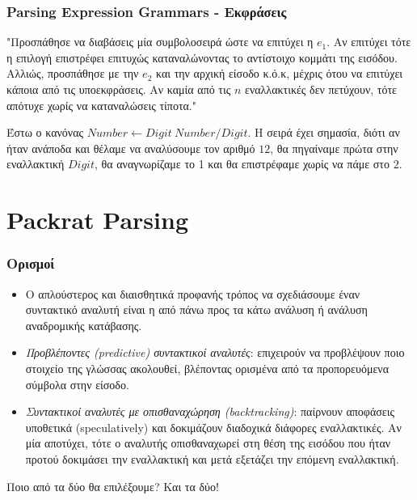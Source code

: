 \documentclass{beamer}
\begin{document}
\begin{frame}
  \frametitle{Parsing Expression Grammars - Εκφράσεις}
 \begin{description}[font=$\bullet$\scshape\bfseries]
   \item[Διατεταγμένη Επιλογή `$(e_1 / e_2 / \ldots / e_n)$':] "Προσπάθησε να διαβάσεις μία συμβολοσειρά ώστε να επιτύχει η $e_1$. 
	 Αν επιτύχει τότε η επιλογή επιστρέφει επιτυχώς καταναλώνοντας το αντίστοιχο κομμάτι της εισόδου.
	 Αλλιώς, προσπάθησε με την $e_2$ και την αρχική είσοδο κ.ό.κ, μέχρις ότου να επιτύχει κάποια από τις υποεκφράσεις.	 Αν καμία από τις $n$ εναλλακτικές δεν πετύχουν, τότε απότυχε χωρίς να καταναλώσεις τίποτα." \pause
  \end{description}
  \begin{example}
    Έστω ο κανόνας $Number \leftarrow Digit~Number / Digit$. 
	Η σειρά έχει σημασία, διότι αν ήταν ανάποδα και  θέλαμε να αναλύσουμε τον αριθμό $12$, θα πηγαίναμε πρώτα στην εναλλακτική $Digit$, θα αναγνωρίζαμε το 1 και θα επιστρέφαμε χωρίς να πάμε στο $2$.
  \end{example}

\end{frame}

\section{Packrat Parsing}

\begin{frame}
  \frametitle{Ορισμοί}
  \begin{itemize}
	\item Ο απλούστερος και διαισθητικά προφανής τρόπος να σχεδιάσουμε έναν συντακτικό αναλυτή είναι η από πάνω προς τα κάτω ανάλυση ή ανάλυση αναδρομικής κατάβασης. 
	\item \textit{Προβλέποντες (predictive) συντακτικοί αναλυτές}: επιχειρούν να προβλέψουν ποιο στοιχείο της γλώσσας ακολουθεί, βλέποντας ορισμένα από τα προπορευόμενα σύμβολα στην είσοδο.
	\item \textit{Συντακτικοί αναλυτές με οπισθαναχώρηση (backtracking)}: παίρνουν αποφάσεις υποθετικά (speculatively) και δοκιμάζουν διαδοχικά διάφορες εναλλακτικές. Aν μία αποτύχει, τότε ο αναλυτής οπισθαναχωρεί στη θέση της εισόδου που ήταν προτού δοκιμάσει την εναλλακτική και μετά εξετάζει την επόμενη εναλλακτική. \pause
  \end{itemize}

  Ποιο από τα δύο θα επιλέξουμε? \pause Και τα δύο!

  \end{frame}
\end{document}
